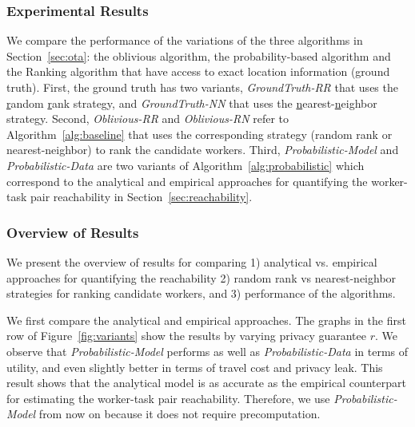 \documentclass{USC-Thesis}
\numberwithin{equation}{chapter}
\begin{document}
\subsubsection{Experimental Results}
\label{sec:results}

We compare the performance of the variations of the three algorithms in Section~\ref{sec:ota}: the oblivious algorithm, the probability-based algorithm and the Ranking algorithm that have access to exact location information (ground truth).
First, the ground truth has two variants, \emph{GroundTruth-RR} that uses the \underline{r}andom \underline{r}ank strategy, and \emph{GroundTruth-NN} that uses the \underline{n}earest-\underline{n}eighbor strategy.
Second, \emph{Oblivious-RR} and \emph{Oblivious-RN} refer to Algorithm~\ref{alg:baseline} that uses the corresponding strategy (random rank or nearest-neighbor) to rank the candidate workers. Third, \emph{Probabilistic-Model} and \emph{Probabilistic-Data} are two variants of Algorithm~\ref{alg:probabilistic} which correspond to the analytical and empirical approaches for quantifying the worker-task pair reachability in Section~\ref{sec:reachability}.


\subsubsection{Overview of Results}
We present the overview of results for comparing 1) analytical vs. empirical approaches for quantifying the reachability 2) random rank vs nearest-neighbor strategies for ranking candidate workers, and 3) performance of the algorithms.

We first compare the analytical and empirical approaches.
The graphs in the first row of Figure~\ref{fig:variants} show the results by varying privacy guarantee $r$. We observe that \emph{Probabilistic-Model} performs as well as \emph{Probabilistic-Data} in terms of utility, and even slightly better in terms of travel cost and privacy leak. This result shows that the analytical model is as accurate as the empirical counterpart for estimating the worker-task pair reachability. Therefore, we use \emph{Probabilistic-Model} from now on because it does not require precomputation.
\end{document}
